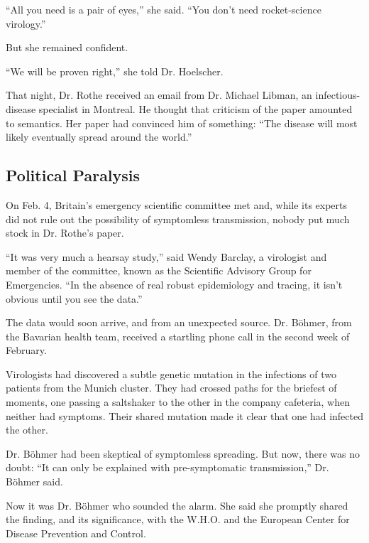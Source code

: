 ``All you need is a pair of eyes,'' she said. ``You don't need
rocket-science virology.''

But she remained confident.

``We will be proven right,'' she told Dr. Hoelscher.

That night, Dr. Rothe received an email from Dr. Michael Libman, an
infectious-disease specialist in Montreal. He thought that criticism of
the paper amounted to semantics. Her paper had convinced him of
something: ``The disease will most likely eventually spread around the
world.''

\hypertarget{political-paralysis}{%
\subsection{Political Paralysis}\label{political-paralysis}}

On Feb. 4, Britain's emergency scientific committee met and, while its
experts did not rule out the possibility of symptomless transmission,
nobody put much stock in Dr. Rothe's paper.

``It was very much a hearsay study,'' said Wendy Barclay, a virologist
and member of the committee, known as the Scientific Advisory Group for
Emergencies. ``In the absence of real robust epidemiology and tracing,
it isn't obvious until you see the data.''

The data would soon arrive, and from an unexpected source. Dr. Böhmer,
from the Bavarian health team, received a startling phone call in the
second week of February.

Virologists had discovered a subtle genetic mutation in the infections
of two patients from the Munich cluster. They had crossed paths for the
briefest of moments, one passing a saltshaker to the other in the
company cafeteria, when neither had symptoms. Their shared mutation made
it clear that one had infected the other.

Dr. Böhmer had been skeptical of symptomless spreading. But now, there
was no doubt: ``It can only be explained with pre-symptomatic
transmission,'' Dr. Böhmer said.

Now it was Dr. Böhmer who sounded the alarm. She said she promptly
shared the finding, and its significance, with the W.H.O. and the
European Center for Disease Prevention and Control.

\href{https://www.nytimes3xbfgragh.onion/news-event/coronavirus?action=click\&pgtype=Article\&state=default\&region=MAIN_CONTENT_3\&context=storylines_faq}{}

